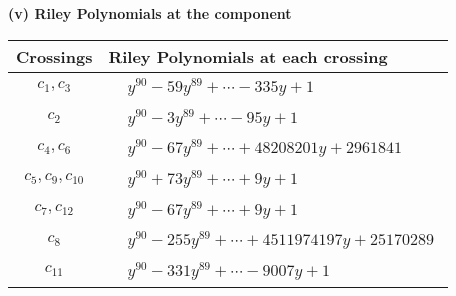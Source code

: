 \documentclass[1p]{elsarticle_modified}
\theoremstyle{definition}
\begin{document}
\newpage\renewcommand{\arraystretch}{1}
\flushleft \textbf{(v) Riley Polynomials at the component}\newline \\
\begin{tabular}{m{50pt}|m{274pt}}
Crossings & \hspace{64pt}Riley Polynomials at each crossing \\
\hline $$\begin{aligned}c_{1},c_{3}\end{aligned}$$&$\begin{aligned}
&y^{90}-59 y^{89}+\cdots-335 y+1
\end{aligned}$\\
\hline $$\begin{aligned}c_{2}\end{aligned}$$&$\begin{aligned}
&y^{90}-3 y^{89}+\cdots-95 y+1
\end{aligned}$\\
\hline $$\begin{aligned}c_{4},c_{6}\end{aligned}$$&$\begin{aligned}
&y^{90}-67 y^{89}+\cdots+48208201 y+2961841
\end{aligned}$\\
\hline $$\begin{aligned}c_{5},c_{9},c_{10}\end{aligned}$$&$\begin{aligned}
&y^{90}+73 y^{89}+\cdots+9 y+1
\end{aligned}$\\
\hline $$\begin{aligned}c_{7},c_{12}\end{aligned}$$&$\begin{aligned}
&y^{90}-67 y^{89}+\cdots+9 y+1
\end{aligned}$\\
\hline $$\begin{aligned}c_{8}\end{aligned}$$&$\begin{aligned}
&y^{90}-255 y^{89}+\cdots+4511974197 y+25170289
\end{aligned}$\\
\hline $$\begin{aligned}c_{11}\end{aligned}$$&$\begin{aligned}
&y^{90}-331 y^{89}+\cdots-9007 y+1
\end{aligned}$\\
\hline
\end{tabular}\\~\\
\end{document}
